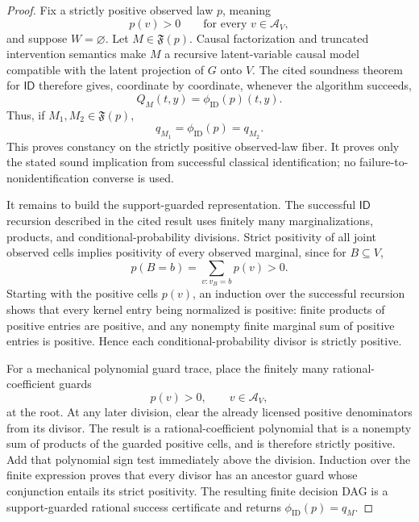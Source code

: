 \documentclass{article}
\begin{document}
\begin{proof}
Fix a strictly positive observed law \(p\), meaning
\[
 p(v)>0\qquad\text{for every }v\in\mathcal A_V,
\]
and suppose \(W=\varnothing\).  Let \(M\in\mathfrak F(p)\).  Causal factorization and truncated intervention semantics make \(M\) a recursive latent-variable causal model compatible with the latent projection of \(G\) onto \(V\).  The cited soundness theorem for \(\mathsf{ID}\) therefore gives, coordinate by coordinate, whenever the algorithm succeeds,
\[
 Q_M(t,y)=\phi_{\mathrm{ID}}(p)(t,y).
\]
Thus, if \(M_1,M_2\in\mathfrak F(p)\),
\[
 q_{M_1}=\phi_{\mathrm{ID}}(p)=q_{M_2}.
\]
This proves constancy on the strictly positive observed-law fiber.  It proves only the stated sound implication from successful classical identification; no failure-to-nonidentification converse is used.

It remains to build the support-guarded representation.  The successful \(\mathsf{ID}\) recursion described in the cited result uses finitely many marginalizations, products, and conditional-probability divisions.  Strict positivity of all joint observed cells implies positivity of every observed marginal, since for \(B\subseteq V\),
\[
 p(B=b)=\sum_{v:v_B=b}p(v)>0.
\]
Starting with the positive cells \(p(v)\), an induction over the successful recursion shows that every kernel entry being normalized is positive: finite products of positive entries are positive, and any nonempty finite marginal sum of positive entries is positive.  Hence each conditional-probability divisor is strictly positive.

For a mechanical polynomial guard trace, place the finitely many rational-coefficient guards
\[
 p(v)>0,\qquad v\in\mathcal A_V,
\]
at the root.  At any later division, clear the already licensed positive denominators from its divisor.  The result is a rational-coefficient polynomial that is a nonempty sum of products of the guarded positive cells, and is therefore strictly positive.  Add that polynomial sign test immediately above the division.  Induction over the finite expression proves that every divisor has an ancestor guard whose conjunction entails its strict positivity.  The resulting finite decision DAG is a support-guarded rational success certificate and returns \(\phi_{\mathrm{ID}}(p)=q_M\).


\end{proof}
\end{document}

